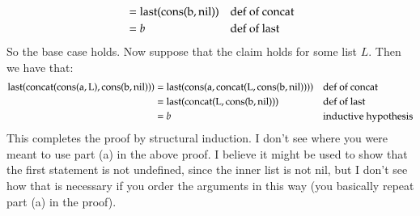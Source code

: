 \documentclass[12pt]{article}
\theoremstyle{definitionstyle}
\begin{document}
\begin{enumerate}[leftmargin=\labelsep]
\begin{enumerate}[label=(\alph*)]
\begin{align*}
\begin{aligned}
                    &= \rm last(cons(b, nil)) && \text{def of concat} \\
                    &= b && \text{def of last}
                \end{aligned}
            \end{align*}
            So the base case holds. Now suppose that the claim holds for some list $L$. Then we have that:
            \begin{align*}
                \begin{aligned}
                    \rm last(concat(\rm cons(a, L), \rm cons(b, nil))) &= \rm last(\rm cons(a, \rm concat(L, \rm cons(b, nil)))) && \text{def of concat} \\
                    &= \rm last(\rm concat(L, \rm cons(b, nil))) && \text{def of last} \\
                    &= b && \text{inductive hypothesis}
                \end{aligned}
            \end{align*}
            This completes the proof by structural induction. I don't see where you were meant to use part (a) in the above proof. I believe it might be used to show that the first statement is not undefined, since the inner list is not nil, but I don't see how that is necessary if you order the arguments in this way (you basically repeat part (a) in the proof). 


\end{enumerate}
\end{enumerate}
\end{document}
